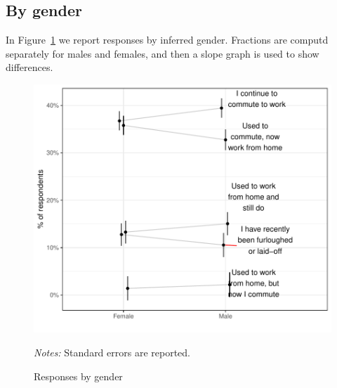 \documentclass[12pt]{article}
\begin{document}
\subsection{By gender} \label{sec:gender}

In Figure~\ref{fig:gender} we report responses by inferred gender.
Fractions are computd separately for males and females, and then a slope graph is used to show differences. 

\begin{figure}
  \caption{Responses by gender} \label{fig:gender}
\centering
\begin{minipage}{1.0 \linewidth}
  \includegraphics[width = \linewidth]{plots/gender.pdf} \\
  \begin{footnotesize}
    \begin{singlespace}
      \emph{Notes:} Standard errors are reported. 
    \end{singlespace}
    \end{footnotesize}
\end{minipage}
\end{figure} 
\end{document}
